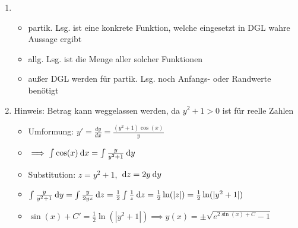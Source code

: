 \item
	\begin{enumerate}
	
	\item
		\begin{itemize}
			\item partik. Lsg. ist eine konkrete Funktion, welche eingesetzt in DGL wahre Aussage ergibt
			\item allg. Lsg. ist die Menge aller solcher Funktionen
			\item außer DGL werden für partik. Lsg. noch Anfangs- oder Randwerte benötigt
		\end{itemize}
	
	\item Hinweis: Betrag kann weggelassen werden, da $y^2+1 > 0$ ist für reelle Zahlen
		\begin{itemize}
			\item Umformung: $y' = \frac{dy}{dx} = \frac{(y^2+1)\cos(x)}{y}$
			\item $\implies \int \cos(x) \:\mathrm{d}{x} = \int \frac{y}{y^2+1} \:\mathrm{d}{y}$
			\item Substitution: $z=y^2+1$, $\:\mathrm{d}{z} = 2y \:\mathrm{d}{y}$
			\item $\int \frac{y}{y^2+1} \:\mathrm{d}{y} = \int \frac{y}{2y z} \:\mathrm{d}{z} = \frac{1}{2} \int \frac{1}{z} \:\mathrm{d}{z} = \frac{1}{2} \ln(|z|) = \frac{1}{2} \ln(|y^2+1|)$
			\item $\sin(x) + C' = \frac{1}{2} \ln(|y^2+1|) \implies y(x) = \pm\sqrt{e^{2\sin(x)+C}-1}$
		\end{itemize}
		
	\end{enumerate}
